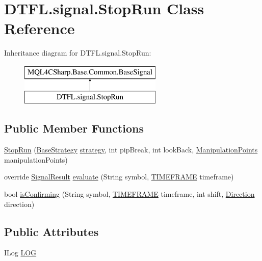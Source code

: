 \hypertarget{class_d_t_f_l_1_1signal_1_1_stop_run}{}\section{D\+T\+F\+L.\+signal.\+Stop\+Run Class Reference}
\label{class_d_t_f_l_1_1signal_1_1_stop_run}
Inheritance diagram for D\+T\+F\+L.\+signal.\+Stop\+Run\+:\begin{figure}[H]
\begin{center}
\leavevmode
\includegraphics[height=2.000000cm]{class_d_t_f_l_1_1signal_1_1_stop_run}
\end{center}
\end{figure}
\subsection*{Public Member Functions}
\begin{DoxyCompactItemize}
\item 
\hyperlink{class_d_t_f_l_1_1signal_1_1_stop_run_acc3a5c64489578199e41ae7b058112ed}{Stop\+Run} (\hyperlink{class_m_q_l4_c_sharp_1_1_base_1_1_base_strategy}{Base\+Strategy} \hyperlink{class_m_q_l4_c_sharp_1_1_base_1_1_common_1_1_base_signal_adc5fd0efe0218a05bd5b0fb84c0d3814}{strategy}, int pip\+Break, int look\+Back, \hyperlink{class_d_t_f_l_1_1input_1_1_manipulation_points}{Manipulation\+Points} manipulation\+Points)
\item 
override \hyperlink{class_m_q_l4_c_sharp_1_1_base_1_1_common_1_1_signal_result}{Signal\+Result} \hyperlink{class_d_t_f_l_1_1signal_1_1_stop_run_a481d9353dbb82252a2bf5d36da1c8b45}{evaluate} (String symbol, \hyperlink{namespace_m_q_l4_c_sharp_1_1_base_1_1_enums_a838810aaa87c63c12737408dba8c0b35}{T\+I\+M\+E\+F\+R\+A\+ME} timeframe)
\item 
bool \hyperlink{class_d_t_f_l_1_1signal_1_1_stop_run_adc31a389a47a4be3794f1d9b241db69f}{is\+Confirming} (String symbol, \hyperlink{namespace_m_q_l4_c_sharp_1_1_base_1_1_enums_a838810aaa87c63c12737408dba8c0b35}{T\+I\+M\+E\+F\+R\+A\+ME} timeframe, int shift, \hyperlink{namespace_m_q_l4_c_sharp_1_1_base_1_1_enums_a8bd45b58389fa72ba1d4e8a192f17510}{Direction} direction)
\end{DoxyCompactItemize}
\subsection*{Public Attributes}
\begin{DoxyCompactItemize}
\item 
I\+Log \hyperlink{class_d_t_f_l_1_1signal_1_1_stop_run_a7d595d8b32390bd020c278714248bc6f}{L\+OG}
\end{DoxyCompactItemize}
